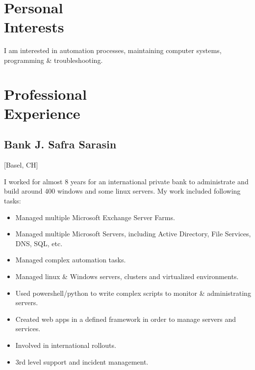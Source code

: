 \documentclass{cv}
\begin{document}
\begin{CJK*}{UTF8}{bsmi}

\maketitle%

\section{Personal \\ Interests}

I am interested in automation processes, maintaining computer systems, programming \& troubleshooting.

\section{Professional \\ Experience}

\subsection{Bank J. Safra Sarasin}[Basel, CH]
\begin{positions}
\end{positions}
I worked for almost 8 years for an international private bank to administrate and build around 400 windows and some linux servers. My work included following tasks:

\begin{itemize}
    \item Managed multiple Microsoft Exchange Server Farms.
    \item Managed multiple Microsoft Servers, including Active Directory, File Services, DNS, SQL, etc.
    \item Managed complex automation tasks.
    \item Managed linux \& Windows servers, clusters and virtualized environments.
    \item Used powershell/python to write complex scripts to monitor \& administrating servers.
    \item Created web apps in a defined framework in order to manage servers and services.
    \item Involved in international rollouts.
    \item 3rd level support and incident management.
\end{itemize}


\end{CJK*}
\end{document}

